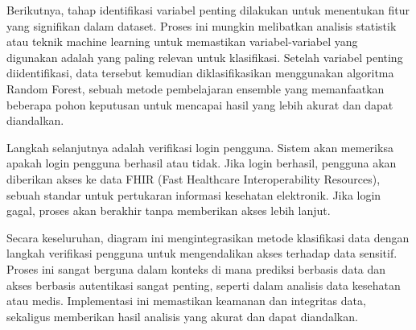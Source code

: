 Berikutnya, tahap identifikasi variabel penting dilakukan untuk menentukan fitur yang signifikan dalam dataset. Proses ini mungkin melibatkan analisis statistik atau teknik machine learning untuk memastikan variabel-variabel yang digunakan adalah yang paling relevan untuk klasifikasi. Setelah variabel penting diidentifikasi, data tersebut kemudian diklasifikasikan menggunakan algoritma Random Forest, sebuah metode pembelajaran ensemble yang memanfaatkan beberapa pohon keputusan untuk mencapai hasil yang lebih akurat dan dapat diandalkan.

Langkah selanjutnya adalah verifikasi login pengguna. Sistem akan memeriksa apakah login pengguna berhasil atau tidak. Jika login berhasil, pengguna akan diberikan akses ke data FHIR (Fast Healthcare Interoperability Resources), sebuah standar untuk pertukaran informasi kesehatan elektronik. Jika login gagal, proses akan berakhir tanpa memberikan akses lebih lanjut.

Secara keseluruhan, diagram ini mengintegrasikan metode klasifikasi data dengan langkah verifikasi pengguna untuk mengendalikan akses terhadap data sensitif. Proses ini sangat berguna dalam konteks di mana prediksi berbasis data dan akses berbasis autentikasi sangat penting, seperti dalam analisis data kesehatan atau medis. Implementasi ini memastikan keamanan dan integritas data, sekaligus memberikan hasil analisis yang akurat dan dapat diandalkan.